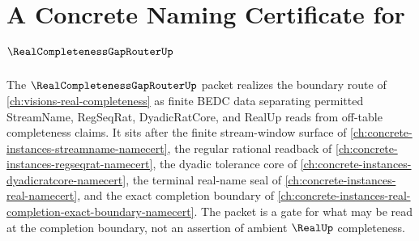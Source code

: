 \chapter{A Concrete Naming Certificate for $\RealCompletenessGapRouterUp$}
\label{ch:concrete-instances-real-completeness-gap-router-namecert}

The $\RealCompletenessGapRouterUp$ packet realizes the boundary route of \autoref{ch:visions-real-completeness} as finite BEDC data separating permitted StreamName, RegSeqRat, DyadicRatCore, and RealUp reads from off-table completeness claims. It sits after the finite stream-window surface of \autoref{ch:concrete-instances-streamname-namecert}, the regular rational readback of \autoref{ch:concrete-instances-regseqrat-namecert}, the dyadic tolerance core of \autoref{ch:concrete-instances-dyadicratcore-namecert}, the terminal real-name seal of \autoref{ch:concrete-instances-real-namecert}, and the exact completion boundary of \autoref{ch:concrete-instances-real-completion-exact-boundary-namecert}. The packet is a gate for what may be read at the completion boundary, not an assertion of ambient $\RealUp$ completeness.

